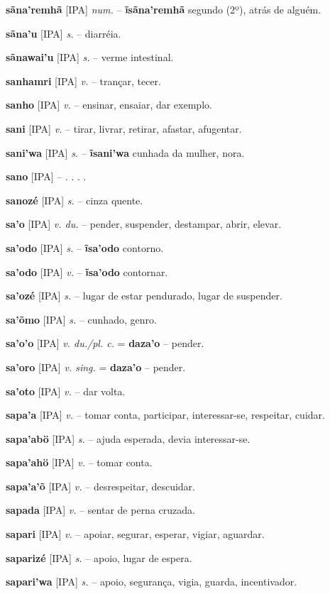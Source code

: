 \textbf{sãna'remhã} [IPA] \textit{num.} -- \textbf{ĩsãna'remhã} segundo (2º), atrás de alguém.

\textbf{sãna'u} [IPA] \textit{s.} -- diarréia.

\textbf{sãnawai'u} [IPA] \textit{s.} -- verme intestinal.

\textbf{sanhamri} [IPA] \textit{v.} -- trançar, tecer.

\textbf{sanho} [IPA] \textit{v.} -- ensinar, ensaiar, dar exemplo.

\textbf{sani} [IPA] \textit{v.} -- tirar, livrar, retirar, afastar, afugentar.

\textbf{sani'wa} [IPA] \textit{s.} -- \textbf{ĩsani'wa} cunhada da mulher, nora.

\textbf{sano} [IPA] \textit{} -- . . . .

\textbf{sanozé} [IPA] \textit{s.} -- cinza quente.

\textbf{sa'o} [IPA] \textit{v. du.} -- pender, suspender,  destampar, abrir, elevar.

\textbf{sa'odo} [IPA] \textit{s.} -- \textbf{ĩsa'odo} contorno.

\textbf{sa'odo} [IPA] \textit{v.} -- \textbf{ĩsa'odo} contornar.

\textbf{sa'ozé} [IPA] \textit{s.} -- lugar de estar pendurado, lugar de suspender.

\textbf{sa'õmo} [IPA] \textit{s.} -- cunhado, genro.

\textbf{sa'o'o} [IPA] \textit{v. du./pl. c.} = \textbf{daza'o} -- pender.

\textbf{sa'oro} [IPA] \textit{v. sing.} = \textbf{daza'o} -- pender.

\textbf{sa'oto} [IPA] \textit{v.} -- dar volta.

\textbf{sapa'a} [IPA] \textit{v.} -- tomar conta, participar, interessar-se, respeitar, cuidar.

\textbf{sapa'abö} [IPA] \textit{s.} -- ajuda esperada, devia interessar-se.

\textbf{sapa'ahö} [IPA] \textit{v.} -- tomar conta.

\textbf{sapa'a'õ} [IPA] \textit{v.} -- desrespeitar, descuidar.

\textbf{sapada} [IPA] \textit{v.} -- sentar de perna cruzada.

\textbf{sapari} [IPA] \textit{v.} -- apoiar, segurar, esperar, vigiar, aguardar.

\textbf{saparizé} [IPA] \textit{s.} -- apoio, lugar de espera.

\textbf{sapari'wa} [IPA] \textit{s.} -- apoio, segurança, vigia, guarda, incentivador.

